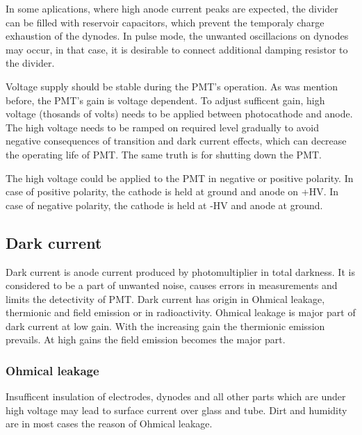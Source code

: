 \par
In some aplications, where high anode current peaks are expected, the divider can be filled with reservoir capacitors, which prevent the temporaly charge exhaustion of the dynodes. In pulse mode, the unwanted oscillacions on dynodes may occur, in that case, it is desirable to connect additional damping resistor to the divider.
\par
Voltage supply should be stable during the PMT's operation. As was mention before, the PMT's gain is voltage dependent. To adjust sufficent gain, high voltage (thosands of volts) needs to be applied between photocathode and anode. The high voltage needs to be ramped on required level gradually to avoid negative consequences of transition and dark current effects, which can decrease the operating life of PMT. The same truth is for shutting down the PMT.
\par
The high voltage could be applied to the PMT in negative or positive polarity. In case of positive polarity, the cathode is held at ground and anode on +HV. In case of negative polarity, the cathode is held at -HV and anode at ground. 

\subsection{Dark current}
Dark current is anode current produced by photomultiplier in total darkness. It is considered to be a part of unwanted noise, causes errors in measurements and limits the detectivity of PMT. Dark current has origin in Ohmical leakage, thermionic and field emission or in radioactivity. Ohmical leakage is major part of dark current at low gain. With the increasing gain the thermionic emission prevails. At high gains the field emission becomes the major part.
\subsubsection{Ohmical leakage}
Insufficent insulation of electrodes, dynodes and all other parts which are under high voltage may lead to surface current over glass and tube. Dirt and humidity are in most cases the reason of Ohmical leakage.

